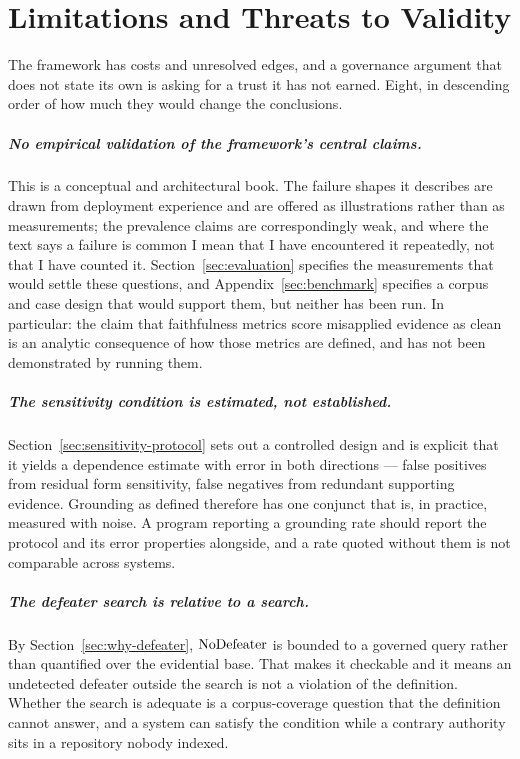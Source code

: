 \chapter{Limitations and Threats to Validity}
\label{ch:limitations}
\label{sec:limitations}

The framework has costs and unresolved edges, and a governance argument that does not
state its own is asking for a trust it has not earned. Eight, in descending order of how
much they would change the conclusions.

\paragraph{No empirical validation of the framework's central claims.} This is a
conceptual and architectural book. The failure shapes it describes are drawn from
deployment experience and are offered as illustrations rather than as measurements; the
prevalence claims are correspondingly weak, and where the text says a failure is common I
mean that I have encountered it repeatedly, not that I have counted it.
Section~\ref{sec:evaluation} specifies the measurements that would settle these
questions, and Appendix~\ref{sec:benchmark} specifies a corpus and case design that would
support them, but neither has been run. In particular: the claim that faithfulness metrics
score misapplied evidence as clean is an analytic consequence of how those metrics are
defined, and has not been demonstrated by running them.

\paragraph{The sensitivity condition is estimated, not established.}
Section~\ref{sec:sensitivity-protocol} sets out a controlled design and is explicit that
it yields a dependence estimate with error in both directions --- false positives from
residual form sensitivity, false negatives from redundant supporting evidence. Grounding
as defined therefore has one conjunct that is, in practice, measured with noise. A
program reporting a grounding rate should report the protocol and its error properties
alongside, and a rate quoted without them is not comparable across systems.

\paragraph{The defeater search is relative to a search.} By
Section~\ref{sec:why-defeater}, $\operatorname{NoDefeater}$ is bounded to a governed query rather than
quantified over the evidential base. That makes it checkable and it means an undetected
defeater outside the search is not a violation of the definition. Whether the search is
adequate is a corpus-coverage question that the definition cannot answer, and a system
can satisfy the condition while a contrary authority sits in a repository nobody indexed.

